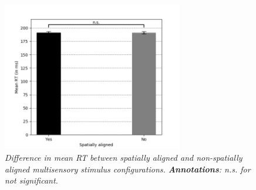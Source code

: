 \documentclass[12pt]{article}
\begin{document}
%
\begin{figure}[t!]
    \centering
    \includegraphics[width=0.7\textwidth]{SAlign_Yes_No.png}
    \caption{\textit{\footnotesize{Difference in mean RT between spatially aligned and non-spatially aligned multisensory stimulus configurations. \textbf{Annotations}: \textit{n.s.} for not significant.}}}
    \label{fig:5}
\end{figure}
%
\end{document}
